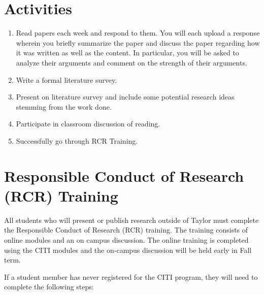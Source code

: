 \documentclass[11pt]{article}
\begin{document}
\section{Activities}

\begin{enumerate}
\item
  Read papers each week and respond to them.
  You will each upload a response
  wherein you briefly summarize the paper and discuss the paper
  regarding how it was written as well as the content.
  In particular, you will be asked to analyze their arguments
  and comment on the strength of their arguments.
\item 
  Write a formal literature survey.
\item 
  Present on literature survey and include some potential research ideas stemming from the work done.
\item 
  Participate in classroom discussion of reading.
\item 
  Successfully go through RCR Training.
\end{enumerate}

\section{Responsible Conduct of Research (RCR) Training}

All students who will present or publish research outside of Taylor
must complete the Responsible Conduct of Research (RCR) training.
The training consists of online modules and an on campus discussion.
The online training is completed using the CITI modules
and the on-campus discussion will be held early in Fall term.

If a student member has never registered for the CITI program,
they will need to complete the following steps:
\end{document}
